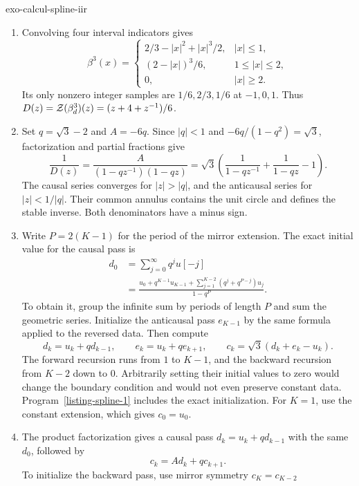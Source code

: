 \begin{correction}{exo-calcul-spline-iir}
\begin{enumerate}
\item Convolving four interval indicators gives
\[
 \beta^3(x)=\begin{cases}
 2/3-|x|^2+|x|^3/2,&|x|\leq1,\\
 (2-|x|)^3/6,&1\leq|x|\leq2,\\
 0,&|x|\geq2.
 \end{cases}
\]
Its only nonzero integer samples are $1/6,2/3,1/6$ at $-1,0,1$.
Thus $D(z)=\mathcal{Z}(\beta_d^3)(z)=(z+4+z^{-1})/6$.
\item Set $q=\sqrt3-2$ and $A=-6q$. Since $|q|<1$ and
$-6q/(1-q^2)=\sqrt3$, factorization and partial fractions give
\[
 \frac1{D(z)}=\frac{A}{(1-qz^{-1})(1-qz)}
 =\sqrt3\left(\frac1{1-qz^{-1}}+\frac1{1-qz}-1\right).
\]
The causal series converges for $|z|>|q|$, and the anticausal series for
$|z|<1/|q|$. Their common annulus contains the unit circle and defines
the stable inverse. Both denominators have a minus sign.
\item Write $P=2(K-1)$ for the period of the mirror extension. The exact
initial value for the causal pass is
\begin{align*}
 d_0&=\sum_{j=0}^{\infty}q^j u[-j]\\
 &=\frac{u_0+q^{K-1}u_{K-1}
     +\sum_{j=1}^{K-2}(q^j+q^{P-j})u_j}{1-q^P}.
\end{align*}
To obtain it, group the infinite sum by periods of length $P$ and sum the
geometric series. Initialize the anticausal pass $e_{K-1}$ by the same
formula applied to the reversed data. Then compute
\[
 d_k=u_k+qd_{k-1},\qquad e_k=u_k+qe_{k+1},\qquad
 c_k=\sqrt3(d_k+e_k-u_k).
\]
The forward recursion runs from $1$ to $K-1$, and the backward recursion
from $K-2$ down to $0$. Arbitrarily setting their initial values to zero
would change the boundary condition and would not even preserve constant
data. Program~\ref{listing-spline-1} includes the exact initialization.
For $K=1$, use the constant extension, which gives $c_0=u_0$.
\begin{listing}[H]
\caption{Cubic spline prefiltering with exact mirror initialization and parallel passes.}
\label{listing-spline-1}
\end{listing}
\item The product factorization gives a causal pass $d_k=u_k+qd_{k-1}$
with the same $d_0$, followed by
\[
 c_k=A d_k+q c_{k+1}.
\]
To initialize the backward pass, use mirror symmetry $c_K=c_{K-2}$

\end{enumerate}
\end{correction}
